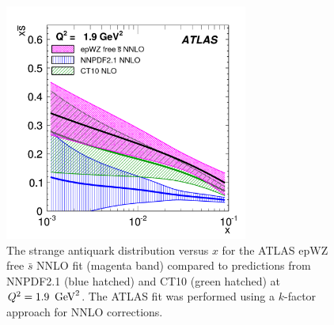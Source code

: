 \begin{itemize}
\begin{figure}[!ht]
  \centering
  \includegraphics[width=8cm]{atlas.pdf}
  \caption{The strange antiquark distribution versus $x$ for the ATLAS
    epWZ free $\bar s$ NNLO fit \cite{atlas:strange} (magenta band) compared to predictions
    from NNPDF2.1 (blue hatched) and CT10 (green hatched) 
    at $Q^2 = 1.9\ \GeV^2$. The ATLAS fit was performed using a $k$-factor approach 
    for NNLO corrections.}
  \label{fig:atlas}
\end{figure}

\end{itemize}


